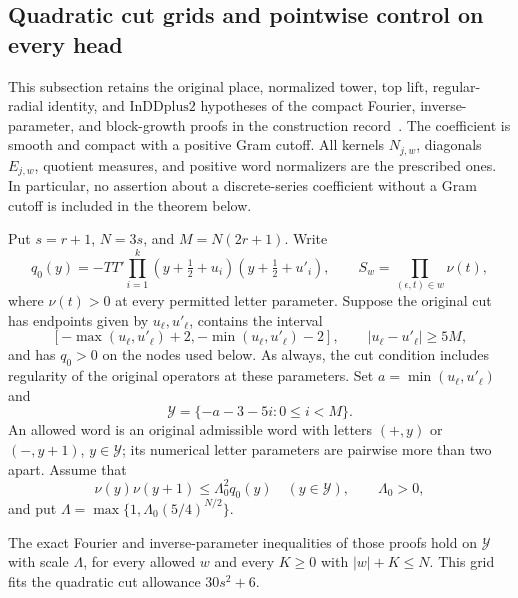 \subsection{Quadratic cut grids and pointwise control on every head}
\label{actual-adaptive-pointwise}

This subsection retains the original place, normalized tower, top
lift, regular-radial identity, and $\mathrm{InDDplus2}$ hypotheses of
the compact Fourier, inverse-parameter, and block-growth proofs
in the construction record~\cite{current-construction-record}.
The coefficient is smooth and compact with a positive Gram cutoff.
All kernels $N_{j,w}$, diagonals $E_{j,w}$, quotient measures, and
positive word normalizers are the prescribed ones.  In particular,
no assertion about a discrete-series coefficient without a Gram
cutoff is included in the theorem below.

Put $s=r+1$, $N=3s$, and $M=N(2r+1)$.  Write
\[
 q_0(y)=-TT'\prod_{i=1}^k
 (y+\tfrac12+u_i)(y+\tfrac12+u'_i),\qquad
 S_w=\prod_{(\epsilon,t)\in w}\nu(t),
\]
where $\nu(t)>0$ at every permitted letter parameter.
Suppose the original cut has endpoints given by $u_\ell,u'_\ell$,
contains the interval
\[
 [-\max(u_\ell,u'_\ell)+2,
  -\min(u_\ell,u'_\ell)-2],
 \qquad |u_\ell-u'_\ell|\ge5M,
\]
and has $q_0>0$ on the nodes used below.  As always, the cut
condition includes regularity of the original operators at these
parameters.  Set $a=\min(u_\ell,u'_\ell)$ and
\[
 \mathcal Y=\{-a-3-5i:0\le i<M\}.
\]
An allowed word is an original admissible word with letters
$(+,y)$ or $(-,y+1)$, $y\in\mathcal Y$; its numerical letter
parameters are pairwise more than two apart.
Assume that
\begin{equation}\label{adaptive-normalizer-premise}
 \nu(y)\nu(y+1)\le\Lambda_0^2q_0(y)
 \quad(y\in\mathcal Y),\qquad \Lambda_0>0,
\end{equation}
and put $\Lambda=\max\{1,\Lambda_0(5/4)^{N/2}\}$.

\begin{lemma}\label{adaptive-grid-lemma}
The exact Fourier and inverse-parameter inequalities of those
proofs hold on $\mathcal Y$ with scale
$\Lambda$, for every allowed $w$ and every $K\ge0$ with
$|w|+K\le N$.  This grid fits the quadratic cut allowance
$30s^2+6$.
\end{lemma}

